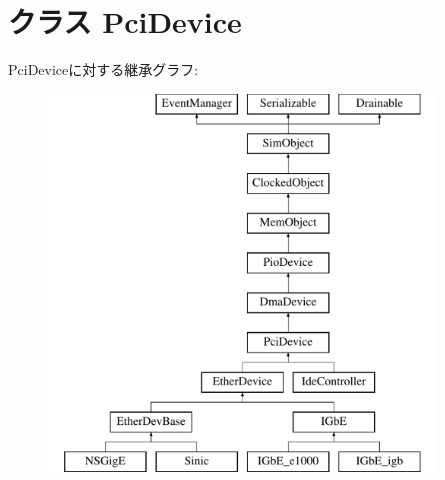 \hypertarget{classPci_1_1PciDevice}{
\section{クラス PciDevice}
\label{classPci_1_1PciDevice}
}
PciDeviceに対する継承グラフ:\begin{figure}[H]
\begin{center}
\leavevmode
\includegraphics[height=10cm]{classPci_1_1PciDevice}
\end{center}
\end{figure}
